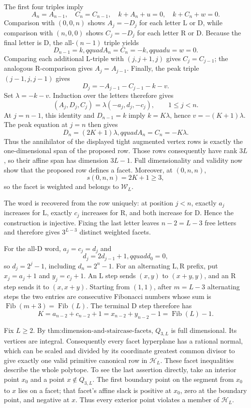 The first four triples imply
\[
 A_n=A_{n-1},\quad C_n=C_{n-1},\quad
 k+A_n+u=0,\quad k+C_n+w=0.
\]
Comparison with \((0,0,n)\) shows \(A_j=-D_j\) for each letter \(\mathrm L\) or \(\mathrm D\), while comparison with \((n,0,0)\) shows \(C_j=-D_j\) for each letter \(\mathrm R\) or \(\mathrm D\).  Because the final letter is \(\mathrm D\), the all-\((n-1)\) triple yields
\[
 D_{n-1}=k,qquad A_n=C_n=-k,qquad u=w=0.
\]
Comparing each additional \(\mathrm L\)-triple with \((j,j+1,j)\) gives \(C_j=C_{j-1}\); the analogous \(\mathrm R\)-comparison gives \(A_j=A_{j-1}\).  Finally, the peak triple \((j-1,j,j-1)\) gives
\[
 D_j=-A_{j-1}-C_{j-1}-k-v.
\]
Set \(\lambda=-k-v\).  Induction over the letters therefore gives
\[
 (A_j,D_j,C_j)=\lambda(-a_j,d_j,-c_j),\qquad 1\le j<n.
\]
At \(j=n-1\), this identity and \(D_{n-1}=k\) imply \(k=K\lambda\), hence \(v=-(K+1)\lambda\).  The peak equation at \(j=n\) then gives
\[
 D_n=(2K+1)\lambda,qquad A_n=C_n=-K\lambda.
\]
Thus the annihilator of the displayed tight augmented vertex rows is exactly the one-dimensional span of the proposed row.  Those rows consequently have rank \(3L\), so their affine span has dimension \(3L-1\).  Full dimensionality and validity now show that the proposed row defines a facet.  Moreover, at \((0,n,n)\),
\[
 s(0,n,n)=2K+1\ge3,
\]
so the facet is weighted and belongs to \(\mathcal W_L\).

The word is recovered from the row uniquely: at position \(j<n\), exactly \(a_j\) increases for \(\mathrm L\), exactly \(c_j\) increases for \(\mathrm R\), and both increase for \(\mathrm D\).  Hence the construction is injective.  Fixing the last letter leaves \(n-2=L-3\) free letters and therefore gives \(3^{L-3}\) distinct weighted facets.

For the all-\(\mathrm D\) word, \(a_j=c_j=d_j\) and
\[
 d_j=2d_{j-1}+1,qquad d_0=0,
\]
so \(d_j=2^j-1\), including \(d_n=2^n-1\).  For an alternating \(\mathrm L,\mathrm R\) prefix, put \(x_j=a_j+1\) and \(y_j=c_j+1\).  An \(\mathrm L\) step sends \((x,y)\) to \((x+y,y)\), and an \(\mathrm R\) step sends it to \((x,x+y)\).  Starting from \((1,1)\), after \(m=L-3\) alternating steps the two entries are consecutive Fibonacci numbers whose sum is \(\operatorname{Fib}(m+3)=\operatorname{Fib}(L)\).  The terminal \(\mathrm D\) step therefore has
\[
 K=a_{n-2}+c_{n-2}+1=x_{n-2}+y_{n-2}-1=\operatorname{Fib}(L)-1.
\]

Fix \(L\ge2\).  By \(\text{thm:dimension-and-staircase-facets}\), \(Q_{3,L}\) is full dimensional.  Its vertices are integral.  Consequently every facet hyperplane has a rational normal, which can be scaled and divided by its coordinate greatest common divisor to give exactly one valid primitive canonical row in \(\mathcal H_L\).  These facet inequalities describe the whole polytope.  To see the last assertion directly, take an interior point \(x_0\) and a point \(x\notin Q_{3,L}\).  The first boundary point on the segment from \(x_0\) to \(x\) lies on a facet; that facet's affine slack is positive at \(x_0\), zero at the boundary point, and negative at \(x\).  Thus every exterior point violates a member of \(\mathcal H_L\).

